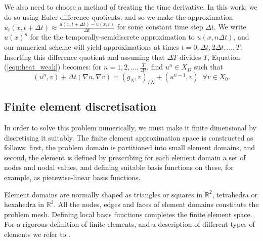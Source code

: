 We also need to choose a method of treating the time derivative. In this work, we do so using Euler difference quotients, and so we make the approximation $u_{t}(x,t+\Delta t) \approx \frac{u(x,t+\Delta t) - u(x,t)}{\Delta t}$ for some constant time step $\Delta t$. We write $u(x)^{n}$ for the the temporally-semidiscrete approximation to $u(x,n\Delta t)$, and our numerical scheme will yield approximations at times $t=0,\Delta t,2\Delta t,...,T$. Inserting this difference quotient and assuming that $\Delta T$ divides $T$, Equation (\ref{eqn:heat_weak}) becomes: for $n=1,2,...,\frac{T}{\Delta t}$, find $u^{n}\in X_{D}$ such that
\begin{equation}
\left( u^{n},v \right) + \Delta t \left(\nabla u,\nabla v \right)=\left(g_{N} ,v \right)_{\Gamma N}+\left( u^{n-1},v \right) \;\;\forall v \in X_{0}.
\label{eqn:heat_weak}
\end{equation}
%
\subsection{Finite element discretisation}
In order to solve this problem numerically, we must make it finite dimensional by discretising it suitably. The finite element approximation space is constructed as follows: first, the problem domain is partitioned into small element domains, and second, the element is defined by prescribing for each element domain a set of nodes and nodal values, and defining  suitable basis functions on these, for example, as piecewise-linear basis functions. 

Element domains are normally shaped as triangles or squares in $\mathbb{R}^{2}$, tetrahedra or hexahedra in $\mathbb{R}^{3}$. All the nodes, edges and faces of element domains constitute
the problem mesh. Defining local basis functions completes the finite element space. For a rigorous definition of finite elements, and a description of different types of elements we refer to \citet{brenner2008mathematical}. 

